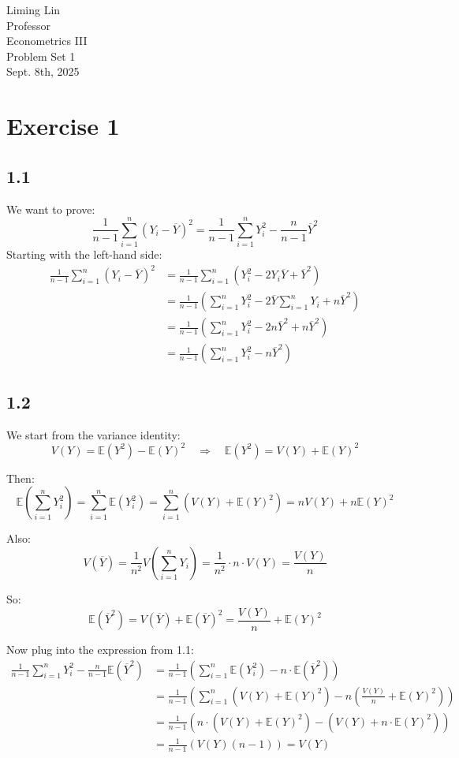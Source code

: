 \documentclass[12pt]{article}
\begin{document}
\begin{flushleft}
Liming Lin\\
Professor \\
Econometrics III\\
Problem Set 1\\
Sept. 8th, 2025\\
\section*{Exercise 1}
\subsection*{1.1}
We want to prove:
\[
\frac{1}{n-1} \sum_{i=1}^n (Y_i - \overline{Y})^2 = \frac{1}{n-1} \sum_{i=1}^n Y_i^2 - \frac{n}{n-1} \overline{Y}^2
\]
Starting with the left-hand side:
\begin{align*}
\frac{1}{n-1} \sum_{i=1}^n (Y_i - \overline{Y})^2 
&= \frac{1}{n-1} \sum_{i=1}^n \left(Y_i^2 - 2Y_i\overline{Y} + \overline{Y}^2\right) \\
&= \frac{1}{n-1} \left( \sum_{i=1}^n Y_i^2 - 2\overline{Y} \sum_{i=1}^n Y_i + n\overline{Y}^2 \right) \\
&= \frac{1}{n-1} \left( \sum_{i=1}^n Y_i^2 - 2n\overline{Y}^2 + n\overline{Y}^2 \right) \\
&= \frac{1}{n-1} \left( \sum_{i=1}^n Y_i^2 - n\overline{Y}^2 \right)
\end{align*}

\subsection*{1.2}
We start from the variance identity:
\[
V(Y) = \mathbb{E}(Y^2) - \mathbb{E}(Y)^2
\quad \Rightarrow \quad
\mathbb{E}(Y^2) = V(Y) + \mathbb{E}(Y)^2
\]

Then:
\[
\mathbb{E}\left(\sum_{i=1}^n Y_i^2\right)
= \sum_{i=1}^n \mathbb{E}(Y_i^2)
= \sum_{i=1}^n \left(V(Y) + \mathbb{E}(Y)^2\right)
= n V(Y) + n \mathbb{E}(Y)^2
\]

Also:
\[
V(\overline{Y}) = \frac{1}{n^2} V\left(\sum_{i=1}^n Y_i\right) 
= \frac{1}{n^2} \cdot n \cdot V(Y) 
= \frac{V(Y)}{n}
\]

So:
\[
\mathbb{E}(\overline{Y}^2) 
= V(\overline{Y}) + \mathbb{E}(\overline{Y})^2 
= \frac{V(Y)}{n} + \mathbb{E}(Y)^2
\]

Now plug into the expression from 1.1:
\begin{align*}
\frac{1}{n-1} \sum_{i=1}^n Y_i^2 
- \frac{n}{n-1} \mathbb{E}(\overline{Y}^2)
&= \frac{1}{n-1} \left( \sum_{i=1}^n \mathbb{E}(Y_i^2) - n \cdot \mathbb{E}(\overline{Y}^2) \right) \\
&= \frac{1}{n-1} \left( \sum_{i=1}^n \left(V(Y) + \mathbb{E}(Y)^2\right) - n \left( \frac{V(Y)}{n} + \mathbb{E}(Y)^2 \right) \right) \\
&= \frac{1}{n-1} \left( n \cdot \left(V(Y) + \mathbb{E}(Y)^2\right) - \left(V(Y) + n \cdot \mathbb{E}(Y)^2 \right) \right) \\
&= \frac{1}{n-1} \left( V(Y)(n - 1) \right) = V(Y)
\end{align*}



\end{flushleft}
\end{document}
